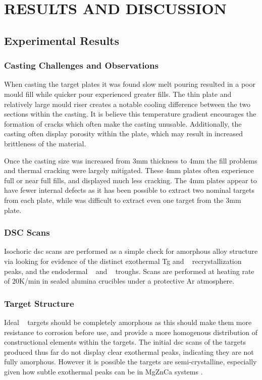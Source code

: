 \documentclass[a4paper,12pt,oneside]{report}%
\begin{document}
\chapter{RESULTS AND DISCUSSION}
\glsresetall

\section{Experimental Results} 
\subsection{Casting Challenges and Observations}
When casting the target plates it was found slow melt pouring resulted in a poor mould fill while quicker pour experienced greater fills. The thin plate and relatively large mould riser creates a notable cooling difference between the two sections within the casting. It is believe this temperature gradient encourages the formation of cracks which often make the casting unusable. Additionally, the casting often display porosity within the plate, which may result in increased brittleness of the material. 

Once the casting size was increased from 3mm thickness to 4mm the fill problems and thermal cracking were largely mitigated. These 4mm plates often experience full or near full fills, and displayed much less cracking. The 4mm plates appear to have fewer internal defects as it has been possible to extract two nominal targets from each plate, while was difficult to extract even one target from the 3mm plate. 

\subsection{DSC Scans}
Isochoric \gls{dsc} scans are performed as a simple check for amorphous alloy structure via looking for evidence of the distinct exothermal \gls{Tg} and \Tx~ recrystallization peaks, and the endodermal \Tm~ and \Tl~ troughs. Scans are performed at heating rate of 20K/min in sealed alumina crucibles under a protective Ar atmosphere.

\subsection{Target Structure}
Ideal \MgZnCa~ targets should be completely amorphous as this should make them more resistance to corrosion before use, and provide a more homogenous distribution of constructional elements within the targets. The initial \gls{dsc} scans of the targets produced thus far do not display clear exothermal peaks, indicating they are not fully amorphous. However it is possible the targets are semi-crystalline, especially given how subtle exothermal peaks can be in MgZnCa systems \cite{Gu2010}. 
\end{document}
